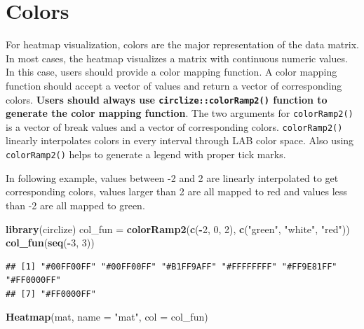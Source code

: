 \documentclass[]{book}
\newenvironment{Shaded}{\begin{snugshade}}{\end{snugshade}}
\newcommand{\KeywordTok}[1]{\textcolor[rgb]{0.13,0.29,0.53}{\textbf{#1}}}
\newcommand{\DataTypeTok}[1]{\textcolor[rgb]{0.13,0.29,0.53}{#1}}
\newcommand{\DecValTok}[1]{\textcolor[rgb]{0.00,0.00,0.81}{#1}}
\newcommand{\StringTok}[1]{\textcolor[rgb]{0.31,0.60,0.02}{#1}}
\newcommand{\OperatorTok}[1]{\textcolor[rgb]{0.81,0.36,0.00}{\textbf{#1}}}
\newcommand{\NormalTok}[1]{#1}
\theoremstyle{definition}
\theoremstyle{definition}
\theoremstyle{definition}
\theoremstyle{remark}
\begin{document}
\section{Colors}\label{colors}

For heatmap visualization, colors are the major representation of the
data matrix. In most cases, the heatmap visualizes a matrix with
continuous numeric values. In this case, users should provide a color
mapping function. A color mapping function should accept a vector of
values and return a vector of corresponding colors. \textbf{Users should
always use \texttt{circlize::colorRamp2()} function to generate the
color mapping function}. The two arguments for \texttt{colorRamp2()} is
a vector of break values and a vector of corresponding colors.
\texttt{colorRamp2()} linearly interpolates colors in every interval
through LAB color space. Also using \texttt{colorRamp2()} helps to
generate a legend with proper tick marks.

In following example, values between -2 and 2 are linearly interpolated
to get corresponding colors, values larger than 2 are all mapped to red
and values less than -2 are all mapped to green.

\begin{Shaded}
\begin{Highlighting}[]
\KeywordTok{library}\NormalTok{(circlize)}
\NormalTok{col_fun =}\StringTok{ }\KeywordTok{colorRamp2}\NormalTok{(}\KeywordTok{c}\NormalTok{(}\OperatorTok{-}\DecValTok{2}\NormalTok{, }\DecValTok{0}\NormalTok{, }\DecValTok{2}\NormalTok{), }\KeywordTok{c}\NormalTok{(}\StringTok{"green"}\NormalTok{, }\StringTok{"white"}\NormalTok{, }\StringTok{"red"}\NormalTok{))}
\KeywordTok{col_fun}\NormalTok{(}\KeywordTok{seq}\NormalTok{(}\OperatorTok{-}\DecValTok{3}\NormalTok{, }\DecValTok{3}\NormalTok{))}
\end{Highlighting}
\end{Shaded}

\begin{verbatim}
## [1] "#00FF00FF" "#00FF00FF" "#B1FF9AFF" "#FFFFFFFF" "#FF9E81FF" "#FF0000FF"
## [7] "#FF0000FF"
\end{verbatim}

\begin{Shaded}
\begin{Highlighting}[]
\KeywordTok{Heatmap}\NormalTok{(mat, }\DataTypeTok{name =} \StringTok{"mat"}\NormalTok{, }\DataTypeTok{col =}\NormalTok{ col_fun)}
\end{Highlighting}
\end{Shaded}
\end{document}
